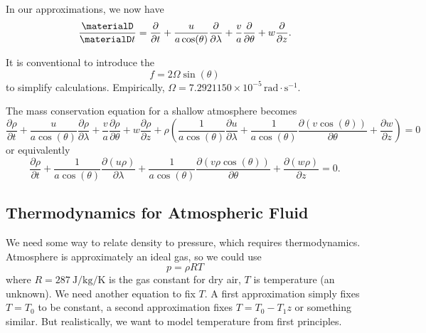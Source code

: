 \begin{note}
In our approximations, we now have
\begin{equation}
  \frac{\materialD}{\materialD t}=\frac{\partial}{\partial t} +
  \frac{u}{a\cos(\theta)}\frac{\partial}{\partial\lambda} +
  \frac{v}{a}\frac{\partial}{\partial\theta} + w\frac{\partial}{\partial z}.
\end{equation}
\end{note}

\begin{defn}
It is conventional to introduce the 
\begin{equation}
  f = 2\Omega\sin(\theta)
\end{equation}
to simplify calculations. Empirically, $\Omega=7.2921150\times10^{-5}\,\mathrm{rad}\cdot\mathrm{s}^{-1}$.
\end{defn}


\begin{prop}
The mass conservation equation for a shallow atmosphere becomes
\begin{equation}
  \frac{\partial\rho}{\partial t}
  + \frac{u}{a\cos(\theta)}\frac{\partial\rho}{\partial\lambda}
  + \frac{v}{a}\frac{\partial\rho}{\partial\theta}
  + w\frac{\partial\rho}{\partial z}
  + \rho\left(\frac{1}{a\cos(\theta)}\frac{\partial u}{\partial\lambda}
              + \frac{1}{a\cos(\theta)}\frac{\partial(v\cos(\theta))}{\partial\theta}
              + \frac{\partial w}{\partial z}
       \right)
  = 0
\end{equation}
or equivalently
\begin{equation}
  \frac{\partial\rho}{\partial t}
  + \frac{1}{a\cos(\theta)}\frac{\partial(u\rho)}{\partial\lambda}
  + \frac{1}{a\cos(\theta)}\frac{\partial(v\rho\cos(\theta))}{\partial\theta}
  + \frac{\partial(w\rho)}{\partial z}
  = 0.
\end{equation}
\end{prop}

\subsection{Thermodynamics for Atmospheric Fluid}
We need some way to relate density to pressure, which requires
thermodynamics. Atmosphere is approximately an ideal gas, so we could
use
\begin{equation}
  p = \rho R T
\end{equation}
where $R=\SI{287}{\joule\per\kilogram\per\kelvin}$ is the gas
constant for dry air, $T$ is temperature (an unknown). We need another
equation to fix $T$. A first approximation simply fixes $T=T_{0}$ to be
constant, a second approximation fixes $T=T_{0}-T_{1}z$ or something
similar. But realistically, we want to model temperature from first
principles.

